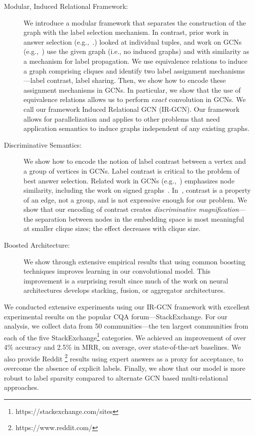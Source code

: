 \begin{description}
  \item[Modular, Induced Relational Framework:] We introduce a modular framework that separates the construction of the graph with the label selection mechanism. In contrast,  prior work in answer selection (e.g.,~\citep{BurelMA16,  JendersKN16, TianZL13, TianL16}.) looked at individual tuples, and work on GCNs (e.g.,~\citep{gcn, DualGCN}) use the given graph (i.e., no induced graphs) and with similarity as a mechanism for label propagation. We use equivalence relations to induce a graph comprising cliques and identify two label assignment mechanisms---label contrast, label sharing. Then, we show how to encode these assignment mechanisms in GCNs. In particular, we show that the use of equivalence relations allows us to perform \textit{exact} convolution in GCNs. We call our framework Induced Relational GCN (IR-GCN). Our framework allows for parallelization and applies to other problems that need application semantics to induce graphs independent of any existing graphs\cite{InducedGraph}.
  \item[Discriminative Semantics:] We show how to encode the notion of label contrast between a vertex and a group of vertices in GCNs. Label contrast is critical to the problem of best answer selection. Related work in GCNs (e.g.,~\citep{gcn, DualGCN}) emphasizes node similarity, including the work on signed graphs~\cite{signedgcn}. In~\citep{signedgcn}, contrast is a property of an edge, not a group, and is not expressive enough for our problem. We show that our encoding of contrast creates \textit{discriminative magnification}---the separation between nodes in the embedding space is most meaningful at smaller clique sizes; the effect decreases with clique size.

  \item[Boosted Architecture:]  We show through extensive empirical results that using common boosting techniques improves learning in our convolutional model. This improvement is a surprising result since much of the work on neural architectures develops stacking, fusion, or aggregator architectures.

\end{description}

We conducted extensive experiments using our IR-GCN framework with excellent experimental results on the popular CQA forum---StackExchange. For our analysis, we collect data from 50 communities---the ten largest communities from each of the five StackExchange\footnote{https://stackexchange.com/sites} categories. We achieved an improvement of over 4\% accuracy and 2.5\% in MRR, on average, over state-of-the-art baselines. We also provide Reddit \footnote{https://www.reddit.com/} results using expert answers as a proxy for acceptance, to overcome the absence of explicit labels. Finally, we show that our model is more robust to label sparsity compared to alternate GCN based multi-relational approaches.

